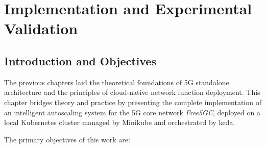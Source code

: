 %
%

\chapter{Implementation and Experimental Validation}
\label{chap:implementation}

\section{Introduction and Objectives}
\label{sec:intro_objectives}

The previous chapters laid the theoretical foundations of \gls{5G} standalone architecture and the principles of cloud-native network function deployment. This chapter bridges theory and practice by presenting the complete implementation of an intelligent autoscaling system for the \gls{5G} core network \emph{Free5GC}, deployed on a local Kubernetes cluster managed by Minikube and orchestrated by \gls{keda}.

The primary objectives of this work are:

